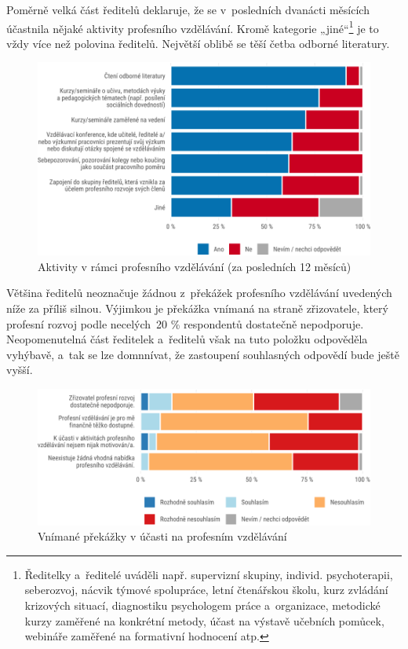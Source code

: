 \documentclass[12pt,a4paper,]{report}
\begin{document}
Poměrně velká část ředitelů deklaruje, že se v~posledních dvanácti měsících účastnila nějaké aktivity profesního vzdělávání. Kromě kategorie „jiné``\footnote{Ředitelky a~ředitelé uváděli např. supervizní skupiny, individ. psychoterapii, seberozvoj, nácvik týmové spolupráce, letní čtenářskou školu, kurz zvládání krizových situací, diagnostiku psychologem práce a~organizace, metodické kurzy zaměřené na konkrétní metody, účast na výstavě učebních pomůcek, webináře zaměřené na formativní hodnocení atp.} je to vždy více než polovina ředitelů. Největší oblibě se těší četba odborné literatury.

\begin{figure}

{\centering \includegraphics[width=\textwidth]{figs/profEduActivities-1} 

}

\caption{Aktivity v rámci profesního vzdělávání (za posledních 12 měsíců)}\label{fig:profEduActivities}
\end{figure}

Většina ředitelů neoznačuje žádnou z~překážek profesního vzdělávání uvedených níže za příliš silnou. Výjimkou je překážka vnímaná na straně zřizovatele, který profesní rozvoj podle necelých~20 \% respondentů dostatečně nepodporuje. Neopomenutelná část ředitelek a~ředitelů však na tuto položku odpověděla vyhýbavě, a~tak se lze domnnívat, že zastoupení souhlasných odpovědí bude ještě vyšší.

\begin{figure}

{\centering \includegraphics[width=\textwidth]{figs/obst-1} 

}

\caption{Vnímané překážky v účasti na profesním vzdělávání}\label{fig:obst}
\end{figure}
\end{document}
